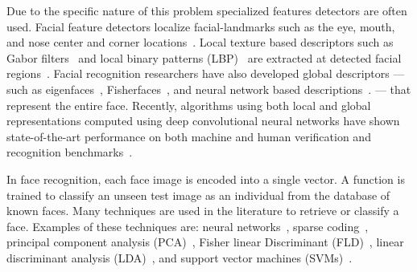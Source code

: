         Due to the specific nature of this problem specialized features
          detectors are often used.
        Facial feature detectors localize facial-landmarks such as the
          eye, mouth, and nose center and corner
          locations~\cite{dantone_realtime_2012, berg_tomvspete_2012}.
        Local texture based descriptors such as Gabor
          filters~\cite{liu_gabor_2002, zhang_histogram_2007,
          shen_review_2006} and local binary patterns
          (LBP)~\cite{ahonen_face_2006, chen_blessing_2013} are extracted
          at detected facial regions~\cite{belhumeur_localizing_2011}.
        Facial recognition researchers have also developed global
          descriptors --- such as eigenfaces~\cite{turk_eigenfaces_1991},
          Fisherfaces~\cite{belhumeur_eigenfaces_1997}, and neural
          network based descriptions~\cite{lawrence_face_1997,
          taigman_deepface_2014}.
        --- that represent the entire face.
        Recently, algorithms using both local and global
          representations computed using deep convolutional neural
          networks have shown state-of-the-art performance on both
          machine and human verification and recognition
          benchmarks~\cite{taigman_deepface_2014}.
        

       

        In face recognition, each face image is encoded into a single vector.
        A function is trained to classify an unseen test image as an
          individual from the database of known faces.
        Many techniques are used in the literature to retrieve or classify a
          face.
        Examples of these techniques are:
        neural networks~\cite{turk_eigenfaces_1991, taigman_deepface_2014},
          sparse coding~\cite{wright_robust_2009, jiang_label_2013}, principal
          component analysis (PCA)~\cite{craw_face_1992}, Fisher linear
          Discriminant (FLD)~\cite{liu_robust_2000}, linear discriminant
          analysis (LDA)~\cite{lu_face_2003}, and support vector machines
          (SVMs)~\cite{phillips_support_1998, levy_svmminus_2013}.

